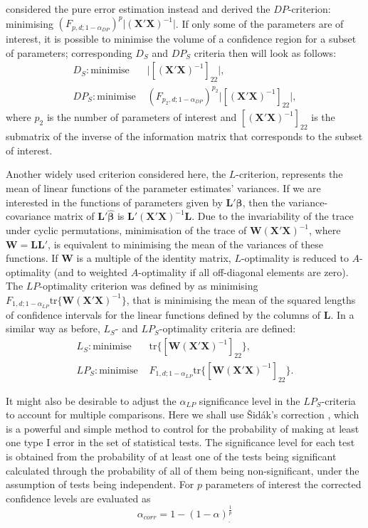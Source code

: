 \citet{GilmourTrinca2012} considered the pure error estimation instead and derived the $DP$-criterion: minimising $(F_{p,d;1-\alpha_{DP}})^{p}\vert(\bm{X'}\bm{X})^{-1}\vert$. If only some of the parameters are of interest, it is possible to minimise the volume of a confidence region for a subset of parameters; corresponding $D_S$ and $DP_S$ criteria then will look as follows:
\begin{align*}
D_S: \mbox{minimise } &\vert [(\bm{X}'\bm{X})^{-1}]_{22}\vert, \\
DP_S: \mbox{minimise } &(F_{p_2,d;1-\alpha_{DP}})^{p_2}\vert [(\bm{X}'\bm{X})^{-1}]_{22}\vert,
\end{align*}
where $p_2$ is the number of parameters of interest and $[(\bm{X}'\bm{X})^{-1}]_{22}$ is the submatrix of the inverse of the information matrix that corresponds to the subset of interest.

Another widely used criterion considered here, the $L$-criterion, represents the mean of linear functions of the parameter estimates' variances. If we are interested in the functions of parameters given by $\bm{L}'\bm{\beta}$, then the variance-covariance matrix of $\bm{L}'\bm{\hat{\beta}}$ is $\bm{L}'(\bm{X}'\bm{X})^{-1}\bm{L}$. Due to the invariability of the trace under cyclic permutations, minimisation of the trace of $\bm{W}(\bm{X}'\bm{X})^{-1}$, where $\bm{W}=\bm{LL}'$, is equivalent to minimising the mean of the variances of these functions. If $\bm{W}$ is a multiple of the identity matrix, $L$-optimality is reduced to $A$-optimality (and to weighted $A$-optimality if all off-diagonal elements are zero). The $LP$-optimality criterion was defined by \citet{GilmourTrinca2012} as minimising  $F_{1,d;1-\alpha_{LP}}\mbox{tr}\{\bm{W}(\bm{X}'\bm{X})^{-1}\}$, that is minimising the mean of the squared lengths of confidence intervals for the linear functions defined by the columns of $\bm{L}$. In a similar way as before, $L_S$- and $LP_S$-optimality criteria are defined:
\begin{align}
\label{eq::LS}
L_S: \mbox{minimise } &\mbox{tr}\{[\bm{W}(\bm{X}'\bm{X})^{-1}]_{22}\}, \\
\label{eq::LPS}
LP_S: \mbox{minimise } &F_{1,d;1-\alpha_{LP}}\mbox{tr}\{[\bm{W}(\bm{X}'\bm{X})^{-1}]_{22}\}.
\end{align}

It might also be desirable to adjust the $\alpha_{LP}$  significance level in the $LP_S$-criteria to account for multiple comparisons. Here we shall use \v{S}id{\'a}k's correction \citep{vsidak1967rectangular}, which is a powerful and simple method to control for the probability of making at least one type I error in the set of statistical tests. The significance level for each test is obtained from the probability of at least one of the tests being significant calculated through the probability of all of them being non-significant, under the assumption of tests being independent. For $p$ parameters of interest the corrected confidence levels are evaluated as 
\begin{equation}
\label{eq::Sidak}
\alpha_{corr}=1-(1-\alpha)^{\frac{1}{p}}_{.}
\end{equation}


